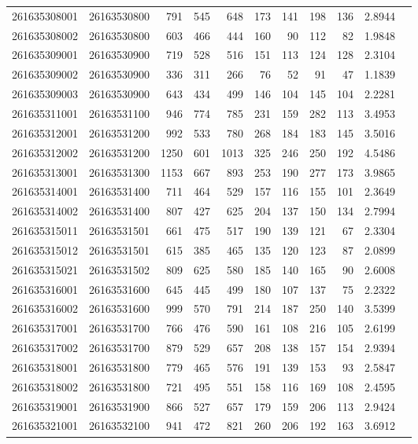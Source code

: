 \documentclass[11pt,landscape]{article}
\begin{document}
{\begin{longtable}[]{@{}lrrrrrrrrrr@{}}
261635308001 & 26163530800 & 791 & 545 & 648 & 173 & 141 & 198 & 136 & 2.8944 \\
261635308002 & 26163530800 & 603 & 466 & 444 & 160 & 90 & 112 & 82 & 1.9848 \\
261635309001 & 26163530900 & 719 & 528 & 516 & 151 & 113 & 124 & 128 & 2.3104 \\
261635309002 & 26163530900 & 336 & 311 & 266 & 76 & 52 & 91 & 47 & 1.1839 \\
261635309003 & 26163530900 & 643 & 434 & 499 & 146 & 104 & 145 & 104 & 2.2281 \\
261635311001 & 26163531100 & 946 & 774 & 785 & 231 & 159 & 282 & 113 & 3.4953 \\
261635312001 & 26163531200 & 992 & 533 & 780 & 268 & 184 & 183 & 145 & 3.5016 \\
261635312002 & 26163531200 & 1250 & 601 & 1013 & 325 & 246 & 250 & 192 & 4.5486 \\
261635313001 & 26163531300 & 1153 & 667 & 893 & 253 & 190 & 277 & 173 & 3.9865 \\
261635314001 & 26163531400 & 711 & 464 & 529 & 157 & 116 & 155 & 101 & 2.3649 \\
261635314002 & 26163531400 & 807 & 427 & 625 & 204 & 137 & 150 & 134 & 2.7994 \\
261635315011 & 26163531501 & 661 & 475 & 517 & 190 & 139 & 121 & 67 & 2.3304 \\
261635315012 & 26163531501 & 615 & 385 & 465 & 135 & 120 & 123 & 87 & 2.0899 \\
261635315021 & 26163531502 & 809 & 625 & 580 & 185 & 140 & 165 & 90 & 2.6008 \\
261635316001 & 26163531600 & 645 & 445 & 499 & 180 & 107 & 137 & 75 & 2.2322 \\
261635316002 & 26163531600 & 999 & 570 & 791 & 214 & 187 & 250 & 140 & 3.5399 \\
261635317001 & 26163531700 & 766 & 476 & 590 & 161 & 108 & 216 & 105 & 2.6199 \\
261635317002 & 26163531700 & 879 & 529 & 657 & 208 & 138 & 157 & 154 & 2.9394 \\
261635318001 & 26163531800 & 779 & 465 & 576 & 191 & 139 & 153 & 93 & 2.5847 \\
261635318002 & 26163531800 & 721 & 495 & 551 & 158 & 116 & 169 & 108 & 2.4595 \\
261635319001 & 26163531900 & 866 & 527 & 657 & 179 & 159 & 206 & 113 & 2.9424 \\
261635321001 & 26163532100 & 941 & 472 & 821 & 260 & 206 & 192 & 163 & 3.6912 \\

\end{longtable}}
\end{document}
